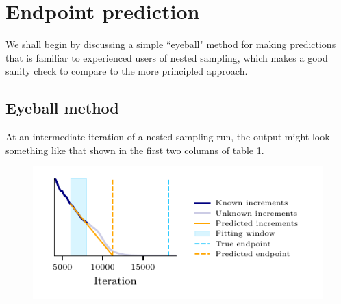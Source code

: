 \documentclass[usenatbib]{mnras} %
\begin{document}
\section{Endpoint prediction}\label{sec:Endpoint prediction}
We shall begin by discussing a simple ``eyeball" method for making predictions that is familiar to experienced users of nested sampling, which makes a good sanity check to compare to the more principled approach.
\subsection{Eyeball method}
At an intermediate iteration of a nested sampling run, the output might look something like that shown in the first two columns of table \ref{tab:ns_output}. 
\begin{figure}
\centering
{}
\label{tab:ns_output}
\end{figure}
\begin{figure}
  \centering
  \includegraphics{figures/linear_extrapolate.pdf}
  \label{fig:linear_extrapolate}
\end{figure}
\end{document}
